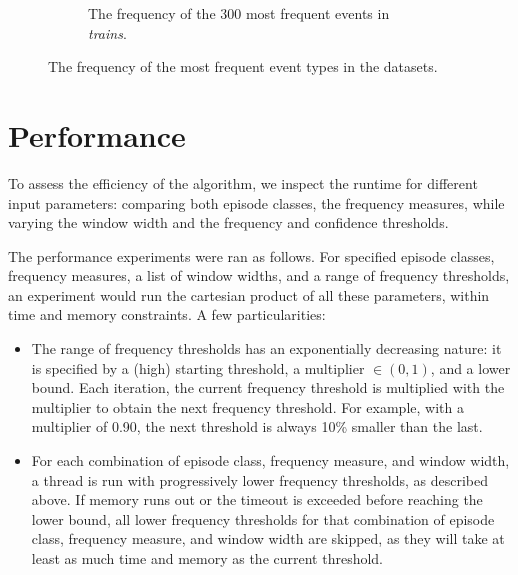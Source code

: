 \begin{figure}
\begin{subfigure}[b]{\textwidth}

\caption{The frequency of the 300 most frequent events in \emph{trains}.}
\label{fig:frequency-plot-trains}
\end{subfigure}

\caption{The frequency of the most frequent event types in the datasets.}
\label{fig:alphabet-frequencies}
\end{figure}


\section{Performance}
\label{sec:performance}

To assess the efficiency of the algorithm, we inspect the runtime for different input parameters: comparing both episode classes, the frequency measures, while varying the window width and the frequency and confidence thresholds.

The performance experiments were ran as follows. For specified episode classes, frequency measures, a list of window widths, and a range of frequency thresholds, an experiment would run the cartesian product of all these parameters, within time and memory constraints. A few particularities:

\begin{itemize}
\item The range of frequency thresholds has an exponentially decreasing nature: it is specified by a (high) starting threshold, a multiplier $ \in (0, 1) $, and a lower bound. Each iteration, the current frequency threshold is multiplied with the multiplier to obtain the next frequency threshold. For example, with a multiplier of 0.90, the next threshold is always 10\% smaller than the last.
\item For each combination of episode class, frequency measure, and window width, a thread is run with progressively lower frequency thresholds, as described above. If memory runs out or the timeout is exceeded before reaching the lower bound, all lower frequency thresholds for that combination of episode class, frequency measure, and window width are skipped, as they will take at least as much time and memory as the current threshold.
\end{itemize}

